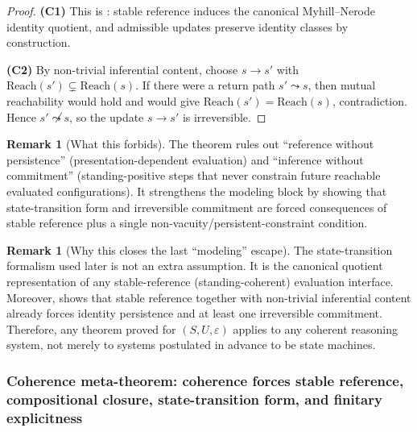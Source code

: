 \documentclass[11pt]{article}
\theoremstyle{definition}
\newtheorem{remark}[theorem]{Remark}
\begin{document}
\begin{proof}
\textbf{(C1)} This is : stable reference induces the canonical Myhill--Nerode identity quotient, and admissible updates
preserve identity classes by construction.

\textbf{(C2)} By non-trivial inferential content, choose $s\to s'$ with $\mathrm{Reach}(s')\subsetneq \mathrm{Reach}(s)$.
If there were a return path $s'\leadsto s$, then mutual reachability would hold and  would give
$\mathrm{Reach}(s')=\mathrm{Reach}(s)$, contradiction.
Hence $s'\not\leadsto s$, so the update $s\to s'$ is irreversible.
\end{proof}

\begin{remark}[What this forbids]
The theorem rules out ``reference without persistence'' (presentation-dependent evaluation) and ``inference without commitment''
(standing-positive steps that never constrain future reachable evaluated configurations).
It strengthens the modeling block by showing that state-transition form and irreversible commitment are forced consequences of
stable reference plus a single non-vacuity/persistent-constraint condition.
\end{remark}

\begin{remark}[Why this closes the last ``modeling'' escape]
The state-transition formalism used later is not an extra assumption.
It is the canonical quotient representation of any stable-reference (standing-coherent) evaluation interface.
Moreover,  shows that stable reference together with non-trivial inferential content already forces
identity persistence and at least one irreversible commitment.
Therefore, any theorem proved for $(S,U,\varepsilon)$ applies to any coherent reasoning system, not merely to systems
postulated in advance to be state machines.
\end{remark}




\subsubsection{Coherence meta-theorem: coherence forces stable reference, compositional closure, state-transition form, and finitary explicitness}
\label{sec:coherence-meta}
\end{document}
